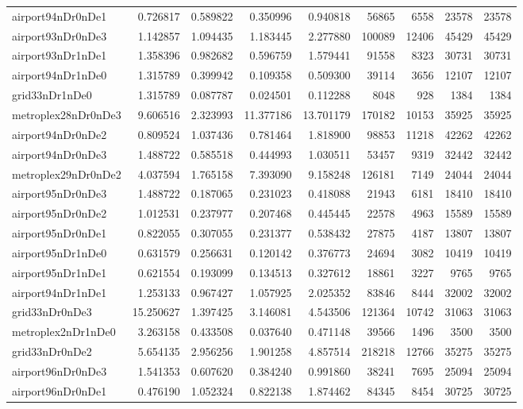 \begin{longtable}{|l|r|r|r|r|r|r|r|r|}
airport94nDr0nDe1 & 0.726817 & 0.589822 & 0.350996 & 0.940818 & 56865 & 6558 & 23578 & 23578 \\
airport93nDr0nDe3 & 1.142857 & 1.094435 & 1.183445 & 2.277880 & 100089 & 12406 & 45429 & 45429 \\
airport93nDr1nDe1 & 1.358396 & 0.982682 & 0.596759 & 1.579441 & 91558 & 8323 & 30731 & 30731 \\
airport94nDr1nDe0 & 1.315789 & 0.399942 & 0.109358 & 0.509300 & 39114 & 3656 & 12107 & 12107 \\
grid33nDr1nDe0 & 1.315789 & 0.087787 & 0.024501 & 0.112288 & 8048 & 928 & 1384 & 1384 \\
metroplex28nDr0nDe3 & 9.606516 & 2.323993 & 11.377186 & 13.701179 & 170182 & 10153 & 35925 & 35925 \\
airport94nDr0nDe2 & 0.809524 & 1.037436 & 0.781464 & 1.818900 & 98853 & 11218 & 42262 & 42262 \\
airport94nDr0nDe3 & 1.488722 & 0.585518 & 0.444993 & 1.030511 & 53457 & 9319 & 32442 & 32442 \\
metroplex29nDr0nDe2 & 4.037594 & 1.765158 & 7.393090 & 9.158248 & 126181 & 7149 & 24044 & 24044 \\
airport95nDr0nDe3 & 1.488722 & 0.187065 & 0.231023 & 0.418088 & 21943 & 6181 & 18410 & 18410 \\
airport95nDr0nDe2 & 1.012531 & 0.237977 & 0.207468 & 0.445445 & 22578 & 4963 & 15589 & 15589 \\
airport95nDr0nDe1 & 0.822055 & 0.307055 & 0.231377 & 0.538432 & 27875 & 4187 & 13807 & 13807 \\
airport95nDr1nDe0 & 0.631579 & 0.256631 & 0.120142 & 0.376773 & 24694 & 3082 & 10419 & 10419 \\
airport95nDr1nDe1 & 0.621554 & 0.193099 & 0.134513 & 0.327612 & 18861 & 3227 & 9765 & 9765 \\
airport94nDr1nDe1 & 1.253133 & 0.967427 & 1.057925 & 2.025352 & 83846 & 8444 & 32002 & 32002 \\
grid33nDr0nDe3 & 15.250627 & 1.397425 & 3.146081 & 4.543506 & 121364 & 10742 & 31063 & 31063 \\
metroplex2nDr1nDe0 & 3.263158 & 0.433508 & 0.037640 & 0.471148 & 39566 & 1496 & 3500 & 3500 \\
grid33nDr0nDe2 & 5.654135 & 2.956256 & 1.901258 & 4.857514 & 218218 & 12766 & 35275 & 35275 \\
airport96nDr0nDe3 & 1.541353 & 0.607620 & 0.384240 & 0.991860 & 38241 & 7695 & 25094 & 25094 \\
airport96nDr0nDe1 & 0.476190 & 1.052324 & 0.822138 & 1.874462 & 84345 & 8454 & 30725 & 30725 \\

\end{longtable}
